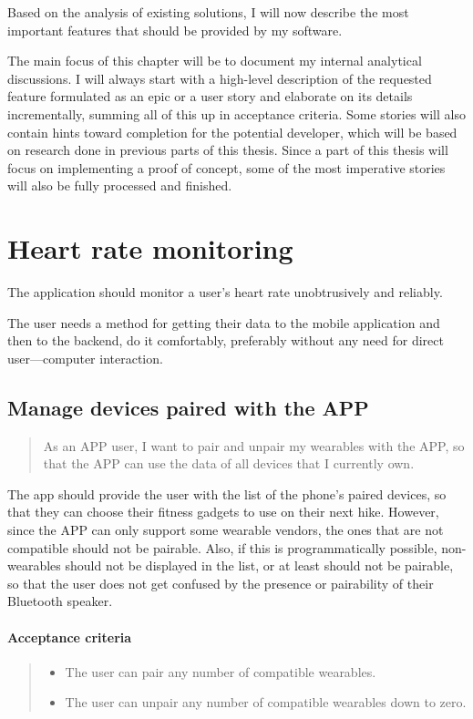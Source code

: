 Based on the analysis of existing solutions, I will now describe the most important features that should be provided by my software.

The main focus of this chapter will be to document my internal analytical discussions.
I will always start with a high-level description of the requested feature formulated as an epic or a user story and elaborate on its details incrementally, summing all of this up in acceptance criteria.
Some stories will also contain hints toward completion for the potential developer, which will be based on research done in previous parts of this thesis.
Since a part of this thesis will focus on implementing a proof of concept, some of the most imperative stories will also be fully processed and finished.

\section{Heart rate monitoring}\label{epic:HRM}
The application should monitor a user's heart rate unobtrusively and reliably.

The user needs a method for getting their data to the mobile application and then to the backend, do it comfortably, preferably without any need for direct user---computer interaction.

\subsection{Manage devices paired with the APP}\label{US:HRM-device-management}
\begin{quote}
As an APP user, I want to pair and unpair my wearables with the APP, so that the APP can use the data of all devices that I currently own.
\end{quote}
The app should provide the user with the list of the phone's paired devices, so that they can choose their fitness gadgets to use on their next hike.
However, since the APP can only support some wearable vendors, the ones that are not compatible should not be pairable.
Also, if this is programmatically possible, non-wearables should not be displayed in the list, or at least should not be pairable,
so that the user does not get confused by the presence or pairability of their Bluetooth speaker.

\paragraph*{Acceptance criteria}
\begin{quote}
    \begin{itemize}
        \item The user can pair any number of compatible wearables.
        \item The user can unpair any number of compatible wearables down to zero.
    \end{itemize}
\end{quote}

